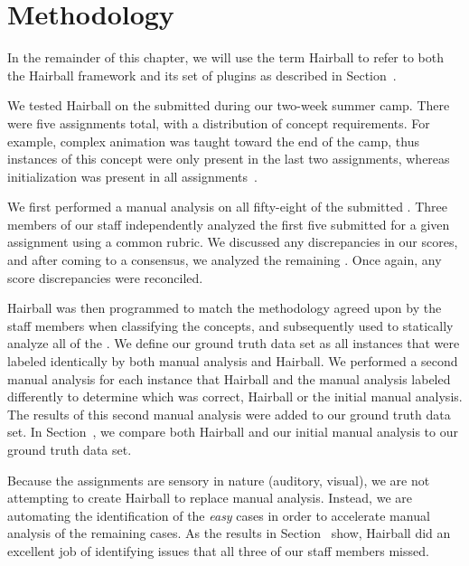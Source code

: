 \section{Methodology} 
In the remainder of this chapter, we will use the term Hairball to refer to
both the Hairball framework and its set of plugins as described in
Section~.

We tested Hairball on the  submitted during our two-week summer
camp.  There were five assignments total, with a distribution of concept
requirements. For example, complex animation was taught toward the end of the
camp, thus instances of this concept were only present in the last two
assignments, whereas initialization was present in all
assignments~\cite{Franklin:2013:SBO}.

We first performed a manual analysis on all fifty-eight of the submitted
.  Three members of our staff independently analyzed the first five
 submitted for a given assignment using a common rubric. We
discussed any discrepancies in our scores, and after coming to a consensus, we
analyzed the remaining . Once again, any score discrepancies were
reconciled.

Hairball was then programmed to match the methodology agreed upon by the staff
members when classifying the concepts, and subsequently used to statically
analyze all of the . We define our ground truth data set as all
instances that were labeled identically by both manual analysis and
Hairball. We performed a second manual analysis for each instance that Hairball
and the manual analysis labeled differently to determine which was correct,
Hairball or the initial manual analysis. The results of this second manual
analysis were added to our ground truth data set. In
Section~, we compare both Hairball and our initial manual
analysis to our ground truth data set.

Because the assignments are sensory in nature (auditory, visual), we are not
attempting to create Hairball to replace manual analysis. Instead, we are
automating the identification of the \emph{easy} cases in order to accelerate
manual analysis of the remaining cases. As the results in
Section~ show, Hairball did an excellent job of
identifying issues that all three of our staff members missed.
